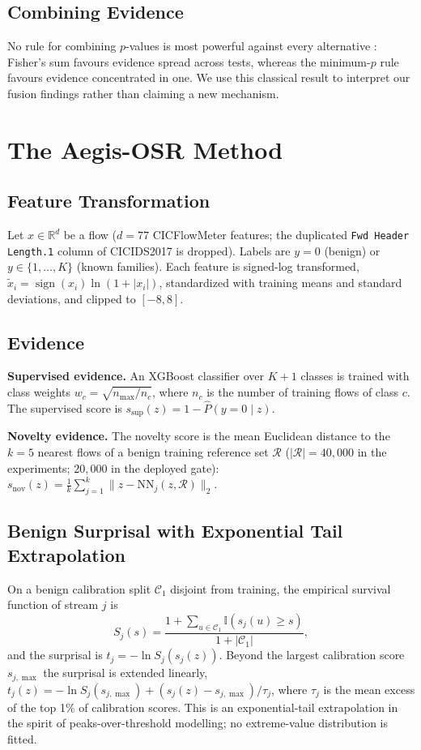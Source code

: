 \documentclass[conference]{IEEEtran}
\begin{document}
\subsection{Combining Evidence}
No rule for combining $p$-values is most powerful against every alternative \cite{birnbaum1954combining,heard2018choosing}: Fisher's sum favours evidence spread across tests, whereas the minimum-$p$ rule favours evidence concentrated in one. We use this classical result to interpret our fusion findings rather than claiming a new mechanism.

\section{The Aegis-OSR Method}
\subsection{Feature Transformation}
Let $x \in \mathbb{R}^d$ be a flow ($d=77$ CICFlowMeter features; the duplicated \texttt{Fwd Header Length.1} column of CICIDS2017 is dropped). Labels are $y=0$ (benign) or $y \in \{1,\dots,K\}$ (known families). Each feature is signed-log transformed, $\tilde{x}_i = \operatorname{sign}(x_i)\ln(1+|x_i|)$, standardized with training means and standard deviations, and clipped to $[-8, 8]$.

\subsection{Evidence}
\textbf{Supervised evidence.} An XGBoost classifier over $K+1$ classes is trained with class weights $w_c = \sqrt{n_{\max}/n_c}$, where $n_c$ is the number of training flows of class $c$. The supervised score is $s_{\text{sup}}(z) = 1-\hat{P}(y=0\mid z)$.

\textbf{Novelty evidence.} The novelty score is the mean Euclidean distance to the $k=5$ nearest flows of a benign training reference set $\mathcal{R}$ ($|\mathcal{R}|=40{,}000$ in the experiments; $20{,}000$ in the deployed gate):
$s_{\text{nov}}(z) = \frac{1}{k}\sum_{j=1}^{k}\|z-\mathrm{NN}_j(z,\mathcal{R})\|_2$.

\subsection{Benign Surprisal with Exponential Tail Extrapolation}
On a benign calibration split $\mathcal{C}_1$ disjoint from training, the empirical survival function of stream $j$ is
\begin{equation}
S_j(s) = \frac{1+\sum_{u\in\mathcal{C}_1}\mathbb{I}(s_j(u)\ge s)}{1+|\mathcal{C}_1|},
\end{equation}
and the surprisal is $t_j = -\ln S_j(s_j(z))$. Beyond the largest calibration score $s_{j,\max}$ the surprisal is extended linearly, $t_j(z) = -\ln S_j(s_{j,\max}) + (s_j(z)-s_{j,\max})/\tau_j$, where $\tau_j$ is the mean excess of the top 1\% of calibration scores. This is an exponential-tail extrapolation in the spirit of peaks-over-threshold modelling; no extreme-value distribution is fitted.
\end{document}
